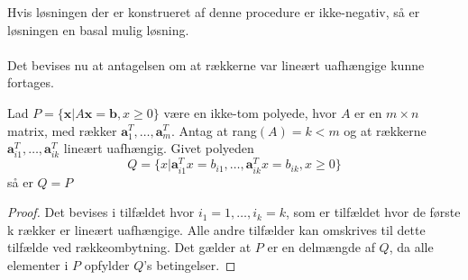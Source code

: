 Hvis løsningen der er konstrueret af denne procedure er ikke-negativ, så er løsningen en basal mulig løsning.
\\\\
\noindent
Det bevises nu at antagelsen om at rækkerne var lineært uafhængige kunne fortages.
\begin{thm}{}{}
Lad $P=\{\textbf{x}|A\textbf{x}=\textbf{b},x\geq 0\}$ være en ikke-tom polyede, hvor $A$ er en $m \times n$ matrix, med rækker $\textbf{a}^{T}_{1},\ldots,\textbf{a}^{T}_{m}$.
Antag at rang$(A)=k<m$ og at rækkerne $\textbf{a}^T_{i1},\ldots,\textbf{a}^T_{ik}$ lineært uafhængig. Givet polyeden 
$$Q=\{x|\textbf{a}^T_{i1}x=b_{i1},\ldots,\textbf{a}^T_{ik}x=b_{ik}, x \geq 0  \}$$ 
så er $Q=P$
\end{thm}
\begin{proof}
Det bevises i tilfældet hvor $i_1=1,\ldots,i_k=k$, som er tilfældet hvor de første k rækker er lineært uafhængige. Alle andre tilfælder kan omskrives til dette tilfælde ved rækkeombytning. Det gælder at $P$ er en delmængde af $Q$, da alle elementer i $P$ opfylder $Q$'s betingelser.


\end{proof}
